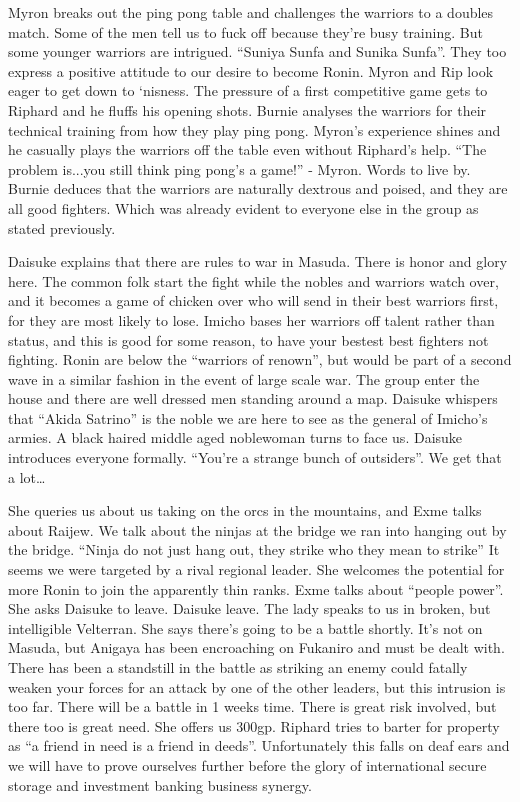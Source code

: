 \begin{multicols}{2}
Myron breaks out the ping pong table and challenges the warriors to a doubles match. Some of the men tell us to fuck off because they’re busy training. But some younger warriors are intrigued. “Suniya Sunfa and Sunika Sunfa”. They too express a positive attitude to our desire to become Ronin. Myron and Rip look eager to get down to ‘nisness. The pressure of a first competitive game gets to Riphard and he fluffs his opening shots. Burnie analyses the warriors for their technical training from how they play ping pong. Myron’s experience shines and he casually plays the warriors off the table even without Riphard’s help. “The problem is...you still think ping pong’s a game!” - Myron. Words to live by. Burnie deduces that the warriors are naturally dextrous and poised, and they are all good fighters. Which was already evident to everyone else in the group as stated previously.\medskip

Daisuke explains that there are rules to war in Masuda. There is honor and glory here. The common folk start the fight while the nobles and warriors watch over, and it becomes a game of chicken over who will send in their best warriors first, for they are most likely to lose. Imicho bases her warriors off talent rather than status, and this is good for some reason, to have your bestest best fighters not fighting. Ronin are below the “warriors of renown”, but would be part of a second wave in a similar fashion in the event of large scale war. The group enter the house and there are well dressed men standing around a map. Daisuke whispers that “Akida Satrino” is the noble we are here to see as the general of Imicho’s armies. A black haired middle aged noblewoman turns to face us. Daisuke introduces everyone formally. “You’re a strange bunch of outsiders”. We get that a lot…\medskip

She queries us about us taking on the orcs in the mountains, and Exme talks about Raijew. We talk about the ninjas at the bridge we ran into hanging out by the bridge. “Ninja do not just hang out, they strike who they mean to strike” It seems we were targeted by a rival regional leader. She welcomes the potential for more Ronin to join the apparently thin ranks. Exme talks about “people power”. She asks Daisuke to leave. Daisuke leave. The lady speaks to us in broken, but intelligible Velterran. She says there’s going to be a battle shortly. It’s not on Masuda, but Anigaya has been encroaching on Fukaniro and must be dealt with. There has been a standstill in the battle as striking an enemy could fatally weaken your forces for an attack by one of the other leaders, but this intrusion is too far. There will be a battle in 1 weeks time. There is great risk involved, but there too is great need. She offers us 300gp. Riphard tries to barter for property as “a friend in need is a friend in deeds”. Unfortunately this falls on deaf ears and we will have to prove ourselves further before the glory of international secure storage and investment banking business synergy.\medskip


\end{multicols}
